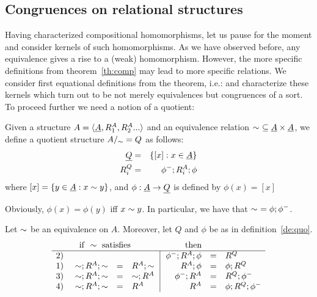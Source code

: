 \documentclass[10pt]{article}
\begin{document}

\subsection{Congruences on relational structures}
\label{sub:congrel}

Having characterized compositional homomorphisms, let us pause for the
moment and consider kernels of such homomorphisms. As we have observed
before, any equivalence gives a rise to a (weak) homomorphism.
However, the more specific definitions from theorem~\ref{th:comp} may
lead to more specific relations. We consider first equational
definitions from the theorem, i.e.: 
and characterize these kernels which turn out to be not merely
equivalences but congruences of a sort. To proceed further we need a
notion of a quotient:

\begin{Definition}
\label{de:quo}
Given a structure $A=\langle\underline {A},R_1^A,R_2^A...\rangle$ and an equivalence
relation $\sim\ \subseteq \underline {A}\times\underline {A}$, we define a
quotient structure $A/_{\sim} = Q$ as follows:
\begin{eqnarray*}
\underline {Q} & = & \{[x] : x\in\underline {A}\} \\
R_i^Q    & = & \phi^-;R_i^A;\phi
\end{eqnarray*}
where $[x] = \{y\in\underline {A}:x\sim y\}$, and $\phi:\underline {A}\rightarrow
\underline {Q}$ is defined by $\phi(x)=[x]$
\end{Definition}
%
Obviously, $\phi(x)=\phi(y)$ iff $x\sim y$. In particular, we have
that $\sim\ = \phi;\phi^-$.

\begin{Prop}
\label{pro:cong}\label{le:canonichom}
Let $\sim$ be an equivalence on $A$. Moreover, let $Q$ and $\phi$ be
as in definition~\ref{de:quo}.
\[
\begin{array}{r@{\ \ \ \ }rcl@{\ \ }|@{\ \ }rcl}
& \multicolumn{3}{l}{{\rm if\ }\congo\ {\rm satisfies}} & \multicolumn{2}{c}{{\rm then}} \\ \hline
2) &   & &                               & \phi^-;R^A;\phi &=& R^Q \\
1) & \congo;R^A;\congo & = & R^A;\congo  & R^A;\phi &=& \phi;R^Q \\
3) & \congo;R^A;\congo & = & \congo;R^A  & \phi^-;R^A &=& R^Q;\phi^- \\
4) & \congo;R^A;\congo & = & R^A         & R^A &=& \phi;R^Q;\phi^-
\end{array}
\]
\end{Prop}
\end{document}
